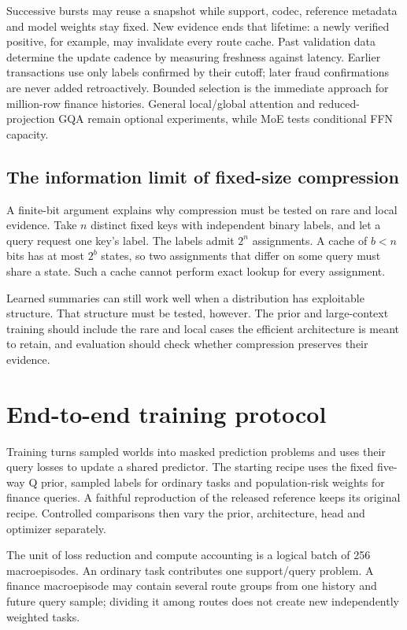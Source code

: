 \documentclass[11pt]{article}
\begin{document}
Successive bursts may reuse a snapshot while support, codec, reference metadata and model weights stay fixed. New evidence ends that lifetime: a newly verified positive, for example, may invalidate every route cache. Past validation data determine the update cadence by measuring freshness against latency. Earlier transactions use only labels confirmed by their cutoff; later fraud confirmations are never added retroactively. Bounded selection is the immediate approach for million-row finance histories. General local/global attention and reduced-projection GQA remain optional experiments, while MoE tests conditional FFN capacity.

\subsection{The information limit of fixed-size compression}

A finite-bit argument explains why compression must be tested on rare and local evidence. Take $n$ distinct fixed keys with independent binary labels, and let a query request one key's label. The labels admit $2^n$ assignments. A cache of $b<n$ bits has at most $2^b$ states, so two assignments that differ on some query must share a state. Such a cache cannot perform exact lookup for every assignment.

Learned summaries can still work well when a distribution has exploitable structure. That structure must be tested, however. The prior and large-context training should include the rare and local cases the efficient architecture is meant to retain, and evaluation should check whether compression preserves their evidence.


\section{End-to-end training protocol}
\label{sec:implementation-recipe}

Training turns sampled worlds into masked prediction problems and uses their query losses to update a shared predictor. The starting recipe uses the fixed five-way Q prior, sampled labels for ordinary tasks and population-risk weights for finance queries. A faithful reproduction of the released reference keeps its original recipe. Controlled comparisons then vary the prior, architecture, head and optimizer separately.

The unit of loss reduction and compute accounting is a logical batch of 256 macroepisodes. An ordinary task contributes one support/query problem. A finance macroepisode may contain several route groups from one history and future query sample; dividing it among routes does not create new independently weighted tasks.
\end{document}
